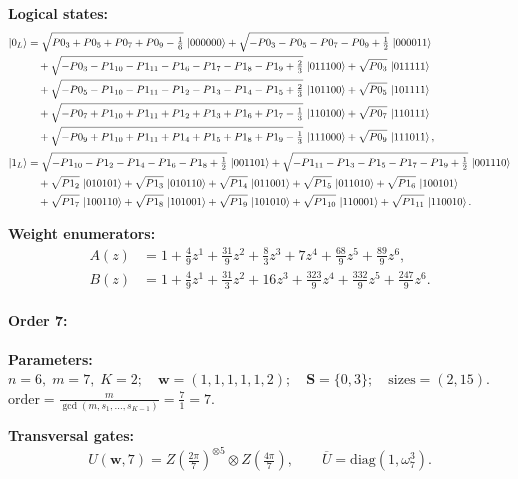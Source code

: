 \documentclass[11pt]{article}
\begin{document}
\noindent\textbf{Logical states:}
\begin{align*}
\ket{0_L} &= \sqrt{P0_3 + P0_5 + P0_7 + P0_9 - \tfrac{1}{6}}\,\ket{000000} + \sqrt{-P0_3 - P0_5 - P0_7 - P0_9 + \tfrac{1}{2}}\,\ket{000011}\\
&\quad + \sqrt{-P0_3 - P1_{10} - P1_{11} - P1_6 - P1_7 - P1_8 - P1_9 + \tfrac{2}{3}}\,\ket{011100} + \sqrt{P0_3}\,\ket{011111}\\
&\quad + \sqrt{-P0_5 - P1_{10} - P1_{11} - P1_2 - P1_3 - P1_4 - P1_5 + \tfrac{2}{3}}\,\ket{101100} + \sqrt{P0_5}\,\ket{101111}\\
&\quad + \sqrt{-P0_7 + P1_{10} + P1_{11} + P1_2 + P1_3 + P1_6 + P1_7 - \tfrac{1}{3}}\,\ket{110100} + \sqrt{P0_7}\,\ket{110111}\\
&\quad + \sqrt{-P0_9 + P1_{10} + P1_{11} + P1_4 + P1_5 + P1_8 + P1_9 - \tfrac{1}{3}}\,\ket{111000} + \sqrt{P0_9}\,\ket{111011},
\\[2pt]
\ket{1_L} &= \sqrt{-P1_{10} - P1_2 - P1_4 - P1_6 - P1_8 + \tfrac{1}{2}}\,\ket{001101} + \sqrt{-P1_{11} - P1_3 - P1_5 - P1_7 - P1_9 + \tfrac{1}{2}}\,\ket{001110}\\
&\quad + \sqrt{P1_2}\,\ket{010101} + \sqrt{P1_3}\,\ket{010110} + \sqrt{P1_4}\,\ket{011001} + \sqrt{P1_5}\,\ket{011010} + \sqrt{P1_6}\,\ket{100101}\\
&\quad + \sqrt{P1_7}\,\ket{100110} + \sqrt{P1_8}\,\ket{101001} + \sqrt{P1_9}\,\ket{101010} + \sqrt{P1_{10}}\,\ket{110001} + \sqrt{P1_{11}}\,\ket{110010}.
\end{align*}

\noindent\textbf{Weight enumerators:}
\begin{align*}
A(z) &= 1 + \tfrac{4}{9}z^{1} + \tfrac{31}{9}z^{2} + \tfrac{8}{3}z^{3} + 7z^{4} + \tfrac{68}{9}z^{5} + \tfrac{89}{9}z^{6},\\[2pt]
B(z) &= 1 + \tfrac{4}{9}z^{1} + \tfrac{31}{3}z^{2} + 16z^{3} + \tfrac{323}{9}z^{4} + \tfrac{332}{9}z^{5} + \tfrac{247}{9}z^{6}.
\end{align*}

\paragraph{\textbf{Order 7:}}
\noindent\textbf{Parameters:} $n=6,\; m=7,\; K=2;\quad \mathbf w=(1, 1, 1, 1, 1, 2);\quad \mathbf S=\{0, 3\};\quad \text{sizes}=\left(2, 15\right).$ $\displaystyle \text{order}=\frac{m}{\gcd(m,s_1,\dots,s_{K-1})}=\frac{7}{1}=7.$

\noindent\textbf{Transversal gates:}
\[
    U(\mathbf w,7)=Z \left(\tfrac{2\pi}{7}\right)^{\otimes5} \otimes Z \left(\tfrac{4\pi}{7}\right) ,\qquad
    \overline U=\mathrm{diag}(1,\omega_{7}^{3}).
\]
\end{document}
